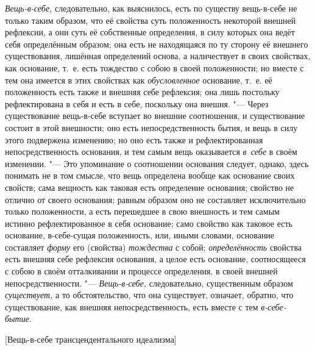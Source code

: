 {\em Вещь-в-себе,} следовательно, как выяснилось, есть
по существу вещь-в-себе не только таким образом, что её свойства суть
положенность некоторой внешней рефлексии, а они суть её собственные
определения, в силу которых она ведёт себя определённым образом; она есть
не находящаяся по ту сторону её внешнего существования, лишённая
определений основа, а наличествует в своих свойствах, как основание, т.~е.
есть тождество с собою в своей положенности; но вместе с тем она имеется в
этих свойствах как {\em обусловленное} основание, т.~е.
её положенность есть также и внешняя себе рефлексия; она лишь постольку
рефлектирована в себя и есть в себе, поскольку она внешня. "--- Через
существование вещь-в-себе вступает во внешние соотношения, и существование
состоит в этой внешности; оно есть непосредственность бытия, и вещь в силу
этого подвержена изменению; но оно есть также и рефлектированная
непосредственность основания, и тем самым вещь оказывается
{\em в~себе} в своём изменении. "--- Это упоминание о
соотношении основания следует, однако, здесь понимать не в том смысле, что
вещь определена вообще как основание своих свойств; сама вещность как
таковая есть определение основания; свойство не отлично от своего
основания; равным образом оно не составляет исключительно только
положенности, а есть перешедшее в свою внешность и тем самым истинно
рефлектированное в себя основание; само свойство как таковое есть
основание, в-себе-сущая положенность, или, иными словами, основание
составляет {\em форму} его (свойства) {\em тождества} с собой;
{\em определённость} свойства есть внешняя себе
рефлексия основания, а целое есть основание, соотносящееся с собою в своём
отталкивании и процессе определения, в своей внешней непосредственности. "---
{\em Вещь-в-себе,} следовательно, существенным образом
{\em существует,} а то обстоятельство, что она
существует, означает, обратно, что существование, как внешняя
непосредственность, есть вместе с тем {\em в-себе-бытие}.

%
  {[Вещь-в-себе трансцендентального идеализма]}

